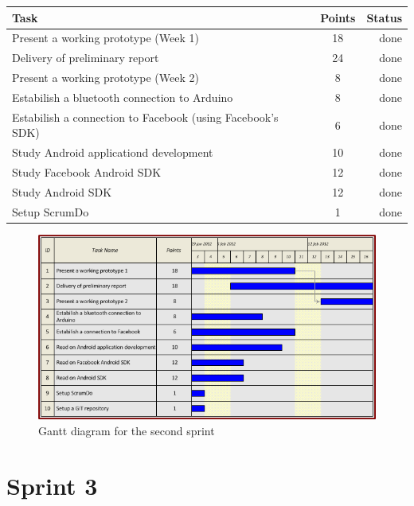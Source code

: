 \begin{table}[ht!]
\begin{tabular}{ | l | c | r | }

\hline
\textbf{Task} & \textbf{Points} & \textbf{Status} \\
\hline

Present a working prototype	(Week 1)	& 18 & done \\
\hline
Delivery of preliminary report			& 24 & done \\
\hline
Present a working prototype	(Week 2)	& 8  & done \\
\hline
Estabilish a bluetooth connection to Arduino	& 8  & done \\
\hline
Estabilish a connection to Facebook
(using Facebook's SDK)				& 6  & done \\
\hline
Study Android applicationd development		& 10 & done \\
\hline
Study Facebook Android SDK			& 12 & done \\
\hline
Study Android SDK				& 12 & done \\
\hline
Setup ScrumDo					& 1  & done \\
\hline

\end{tabular}
\end{table}

\begin{figure}[h!]
\centering \includegraphics[scale=0.8]{img/sprints-gantt2.png}
\caption{Gantt diagram for the second sprint}
\label{fig:sprints-gantt2}
\end{figure}

\newpage

\section{Sprint 3}

